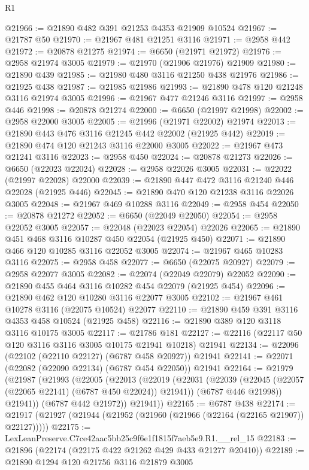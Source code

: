 \begin{lexlean}{R1}
\begin{coremodule}
@21966 := @21890 @482 @391 @21253 @4353 @21909 @10524
@21967 := @21787 @50
@21970 := @21967 @481 @21251 @3116
@21971 := @2958 @442
@21972 := @20878 @21275
@21974 := @6650 (@21971 @21972)
@21976 := @2958 @21974 @3005
@21979 := @21970 (@21906 @21976) @21909
@21980 := @21890 @439
@21985 := @21980 @480 @3116 @21250 @438 @21976
@21986 := @21925 @438
@21987 := @21985 @21986
@21993 := @21890 @478 @120 @21248 @3116 @21974 @3005
@21996 := @21967 @477 @21246 @3116
@21997 := @2958 @446
@21998 := @20878 @21274
@22000 := @6650 (@21997 @21998)
@22002 := @2958 @22000 @3005
@22005 := @21996 (@21971 @22002) @21974
@22013 := @21890 @443 @476 @3116 @21245 @442 @22002 (@21925 @442)
@22019 := @21890 @474 @120 @21243 @3116 @22000 @3005
@22022 := @21967 @473 @21241 @3116
@22023 := @2958 @450
@22024 := @20878 @21273
@22026 := @6650 (@22023 @22024)
@22028 := @2958 @22026 @3005
@22031 := @22022 (@21997 @22028) @22000
@22039 := @21890 @447 @472 @3116 @21240 @446 @22028 (@21925 @446)
@22045 := @21890 @470 @120 @21238 @3116 @22026 @3005
@22048 := @21967 @469 @10288 @3116
@22049 := @2958 @454
@22050 := @20878 @21272
@22052 := @6650 (@22049 @22050)
@22054 := @2958 @22052 @3005
@22057 := @22048 (@22023 @22054) @22026
@22065 := @21890 @451 @468 @3116 @10287 @450 @22054 (@21925 @450)
@22071 := @21890 @466 @120 @10285 @3116 @22052 @3005
@22074 := @21967 @465 @10283 @3116
@22075 := @2958 @458
@22077 := @6650 (@22075 @20927)
@22079 := @2958 @22077 @3005
@22082 := @22074 (@22049 @22079) @22052
@22090 := @21890 @455 @464 @3116 @10282 @454 @22079 (@21925 @454)
@22096 := @21890 @462 @120 @10280 @3116 @22077 @3005
@22102 := @21967 @461 @10278 @3116 (@22075 @10524) @22077
@22110 := @21890 @459 @391 @3116 @4353 @458 @10524 (@21925 @458)
@22116 := @21890 @389 @120 @3118 @3116 @10175 @3005
@22117 := @21786 @181
@22127 := @22116 (@22117 @50 @120 @3116 @3116 @3005 @10175 @21941 @10218) @21941
@22134 := @22096 (@22102 (@22110 @22127) (@6787 @458 @20927)) @21941
@22141 := @22071 (@22082 (@22090 @22134) (@6787 @454 @22050)) @21941
@22164 := @21979
    (@21987
      (@21993
        (@22005
          (@22013
            (@22019
              (@22031
                (@22039 (@22045 (@22057 (@22065 @22141) (@6787 @450 @22024)) @21941))
                (@6787 @446 @21998))
              @21941))
          (@6787 @442 @21972))
        @21941))
@22165 := @6787 @438
@22174 := @21917 (@21927 (@21944 (@21952 (@21960 (@21966 (@22164 (@22165 @21907)) @22127)))))
@22175 := LexLeanPreserve.C7ce42aac5bb25c9f6e1f1815f7aeb5e9.R1.__rel_15
@22183 := @21896 (@22174 (@22175 @422 @21262 @429 @433 @21277 @20410))
@22189 := @21890 @1294 @120 @21756 @3116 @21879 @3005

\end{coremodule}
\end{lexlean}
